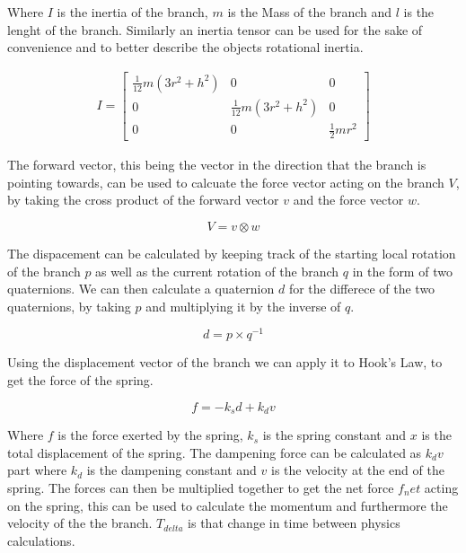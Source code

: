 \noindent
Where $I$ is the inertia of the branch, $m$ is the Mass of the branch and $l$ is the lenght of the branch. Similarly an inertia tensor can be used for the sake of convenience and to better describe the objects rotational inertia. 

\begin{equation}
\begin{aligned}
I = \begin{bmatrix}
\frac{1}{12}m(3r^2 + h^2) 	& 0 							& 0 \\
0 							& \frac{1}{12}m(3r^2 + h^2)		& 0 \\
0 							& 0 							& \frac{1}{2}mr^2 
\end{bmatrix}
\end{aligned}
\end{equation}

\noindent
The forward vector, this being the vector in the direction that the branch is pointing towards, can be used to calcuate the force vector acting on the branch $V$, by taking the cross product of the forward  vector $v$ and the force vector $w$.

\begin{equation}
V = v \otimes w
\end{equation}

\noindent
The dispacement can be calculated by keeping track of the starting local rotation of the branch $p$ as well as the current rotation of the branch $q$ in the form of two quaternions. We can then calculate a quaternion $d$ for the differece of the two quaternions, by taking $p$ and multiplying it by the inverse of $q$. 

\begin{equation}
d = p \times q^{-1}
\end{equation}

\noindent
Using the displacement vector of the branch we can apply it to Hook's Law, to get the force of the spring. 

\begin{equation}
f = -k _s d + k _d v
\end{equation}

\noindent
Where $f$ is the force exerted by the spring, $k _s$ is the spring constant and $x$ is the total displacement of the spring. The dampening force can be calculated as $k _d v$ part where $k _d$ is the dampening constant and $v$ is the velocity at the end of the spring. The forces can then be multiplied together to get the net force $f_net$ acting on the spring, this can be used to calculate the momentum and furthermore the velocity of the the branch. $T_{delta}$ is that change in time between physics calculations.

